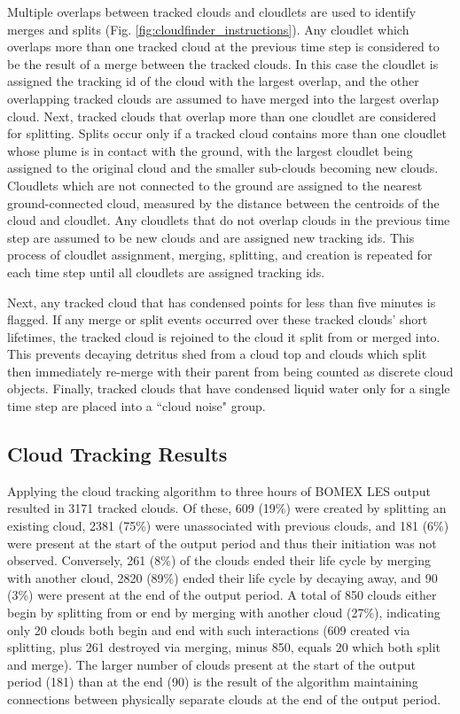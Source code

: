 \documentclass[acp]{copernicus}
\begin{document}
Multiple overlaps between tracked clouds and cloudlets are used to identify 
merges and splits (Fig. \ref{fig:cloudfinder_instructions}).  Any cloudlet 
which overlaps more than one tracked cloud at the previous time step is 
considered to be the result of a merge between the tracked clouds.  In this 
case the cloudlet is assigned the tracking id of the cloud with the largest
overlap, and the other overlapping tracked clouds are assumed to have merged 
into the largest overlap cloud.  Next, tracked clouds that overlap more than 
one cloudlet are considered for splitting.  Splits occur only if a tracked 
cloud contains more than one cloudlet whose plume is in contact with the 
ground, with the largest cloudlet being assigned to the original cloud and the
smaller sub-clouds becoming new clouds. Cloudlets which are not connected to 
the ground are assigned to the nearest ground-connected cloud, measured by the
distance between the centroids of the cloud and cloudlet.  Any cloudlets that 
do not overlap clouds in the previous time step are assumed to be new clouds 
and are assigned new tracking ids. This process of cloudlet assignment, 
merging, splitting, and creation is repeated for each time step until all 
cloudlets are assigned tracking ids.
  
Next, any tracked cloud that has condensed points for less than five minutes is
flagged.  If any merge or split events occurred over these tracked clouds' 
short lifetimes, the tracked cloud is rejoined to the cloud it split from or 
merged into.  This prevents decaying detritus shed from a cloud top and clouds 
which split then immediately re-merge with their parent from being counted as
discrete cloud objects.  Finally, tracked clouds that have condensed liquid 
water only for a single time step are placed into a ``cloud noise" group. 

\subsection{Cloud Tracking Results}

Applying the cloud tracking algorithm to three hours of BOMEX LES output 
resulted in 3171 tracked clouds.  Of these, 609 (19\%) were created by 
splitting an existing cloud, 2381 (75\%) were unassociated with previous 
clouds, and 181 (6\%) were present at the start of the output period and thus 
their initiation was not observed.  Conversely, 261 (8\%) of the clouds ended 
their life cycle by merging with another cloud, 2820 (89\%) ended their 
life cycle by decaying away, and 90 (3\%) were present at the end of the output 
period.  A total of 850 clouds either begin by splitting from or end by merging 
with another cloud (27\%), indicating only 20 clouds both begin and end with 
such interactions (609 created via splitting, plus 261 destroyed via merging, 
minus 850, equals 20 which both split and merge).  The larger number of clouds 
present at the start of the output period (181) than at the end (90) is the 
result of the algorithm maintaining connections between physically separate 
clouds at the end of the output period.
\end{document}
